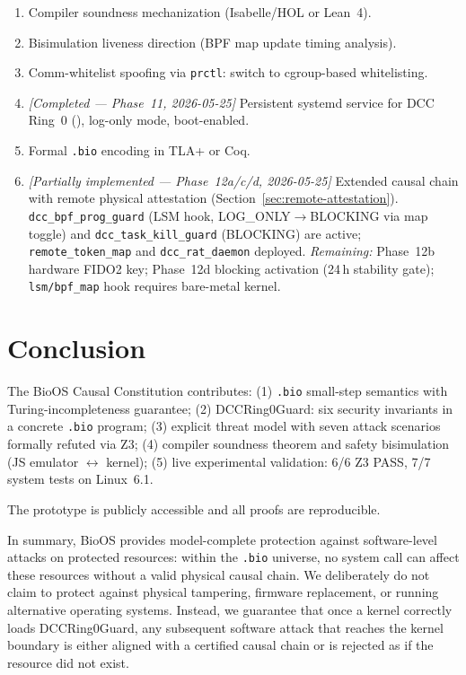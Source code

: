 \documentclass[11pt,a4paper,twoside]{article}
\begin{document}
\begin{enumerate}[topsep=2pt,itemsep=2pt]
  \item Compiler soundness mechanization (Isabelle/HOL or Lean~4).
  \item Bisimulation liveness direction (BPF map update timing analysis).
  \item Comm-whitelist spoofing via \texttt{prctl}: switch to cgroup-based whitelisting.
  \item \textit{[Completed — Phase~11, 2026-05-25]} Persistent systemd service
        for DCC Ring~0 (), log-only mode, boot-enabled.
  \item Formal \texttt{.bio} encoding in TLA+ or Coq.
  \item \textit{[Partially implemented — Phase~12a/c/d, 2026-05-25]}
        Extended causal chain with remote physical attestation
        (Section~\ref{sec:remote-attestation}).
        \texttt{dcc\_bpf\_prog\_guard} (LSM hook, LOG\_ONLY$\to$BLOCKING via
        map toggle) and \texttt{dcc\_task\_kill\_guard} (BLOCKING) are active;
        \texttt{remote\_token\_map} and \texttt{dcc\_rat\_daemon} deployed.
        \textit{Remaining:} Phase~12b hardware FIDO2 key; Phase~12d blocking
        activation (24\,h stability gate); \texttt{lsm/bpf\_map} hook requires
        bare-metal kernel.
\end{enumerate}

\section{Conclusion}

The BioOS Causal Constitution contributes:
(1) \texttt{.bio} small-step semantics with Turing-incompleteness guarantee;
(2) DCCRing0Guard: six security invariants in a concrete \texttt{.bio} program;
(3) explicit threat model with seven attack scenarios formally refuted via Z3;
(4) compiler soundness theorem and safety bisimulation (JS emulator $\leftrightarrow$ kernel);
(5) live experimental validation: 6/6 Z3 PASS, 7/7 system tests on Linux~6.1.

The prototype is publicly accessible and all proofs are reproducible.

In summary, BioOS provides model-complete protection against software-level attacks
on protected resources: within the \texttt{.bio} universe, no system call can affect
these resources without a valid physical causal chain. We deliberately do not claim
to protect against physical tampering, firmware replacement, or running alternative
operating systems. Instead, we guarantee that once a kernel correctly loads
DCCRing0Guard, any subsequent software attack that reaches the kernel boundary is
either aligned with a certified causal chain or is rejected as if the resource did
not exist.
\end{document}
